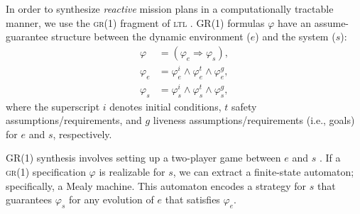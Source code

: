 In order to synthesize \emph{reactive} mission plans in a computationally tractable manner, we use the \textsc{gr(1)} fragment of \textsc{ltl} \cite{Bloem2012GR1}.
\textsc{GR(1)} formulas $\varphi$ have an assume-guarantee structure between the dynamic environment ($e$) and the system ($s$):
\begin{equation}\label{GR1Formula}
\begin{split}
	\varphi &= (\varphi_e \Rightarrow \varphi_s),\\
	\varphi_e &= \varphi_e^i \wedge \varphi_e^t \wedge \varphi_e^g,\\
	\varphi_s &= \varphi_s^i \wedge \varphi_s^t \wedge \varphi_s^g,
\end{split}
\end{equation}
where the superscript $i$ denotes initial conditions, $t$ safety assumptions/requirements, and $g$ liveness assumptions/requirements (i.e., goals) for $e$ and $s$, respectively. 

\textsc{GR(1)} synthesis involves setting up a two-player game between $e$ and $s$ \cite{Bloem2012GR1}.
If a \textsc{gr(1)} specification $\varphi$ is realizable for $s$, we can extract a finite-state automaton; specifically, a Mealy machine. 
This automaton encodes a strategy for $s$ that guarantees $\varphi_s$ for any evolution of $e$ that satisfies $\varphi_e$.

